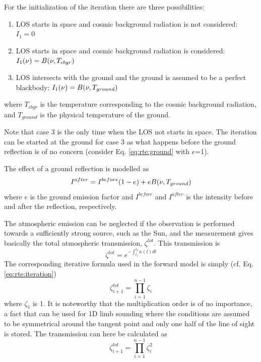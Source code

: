  
 For the initialization of the iteration there are three possibilities:
    
 \begin{enumerate}
      \item LOS starts in space and cosmic background radiation is not
            considered: $I_1=0$
      \item LOS starts in space and cosmic background radiation is 
            considered: $I_1(\nu)=B(\nu,T_{cbgr})$
      \item LOS intersects with the ground and the ground is assumed to 
            be a perfect blackbody: $I_1(\nu)=B(\nu,T_{ground})$
 \end{enumerate}
 where $T_{cbgr}$ is the temperature corresponding to the cosmic
 background radiation, and $T_{ground}$ is the physical temperature of
 the ground.
 
 Note that case 3 is the only time when the LOS not starts in space.  The
 iteration can be started at the ground for case 3 as what happens
 before the ground reflection is of no concern (consider Eq.
 \ref{eq:rte:ground} with $e$=1).


  \label{sec:rte:ground}

 The effect of a ground reflection is modelled as
 \begin{equation}
   I^{after} = I^{before}(1-e) + eB(\nu,T_{ground})
  \label{eq:rte:ground}
 \end{equation} 
 where $e$ is the ground emission factor and $I^{before}$ and
 $I^{after}$ is the intensity before and after the reflection,
 respectively. 


 \label{sec:rte:trans}
  
 The atmospheric emission can be neglected if the observation is
 performed towards a sufficiently strong source, such as the Sun, and
 the measurement gives basically the total atmospheric transmission,
 $\zeta^{tot}$. This transmission is
 \begin{equation}
   \zeta^{tot} = e^{-\int_{l_1}^{l_2}{\kappa(l)dl}}
  \label{eq:rte:tottrans}
 \end{equation}
 The corresponding iterative formula used in the forward model is
 simply (cf. Eq. \ref{eq:rte:iteration})
 \begin{equation}
   \zeta_{i+1}^{tot} = \prod_{i=1}^{n-1}\zeta_{i}
 \end{equation} 
 where $\zeta_1$ is 1. It is noteworthy that the multiplication order
 is of no importance, a fact that can be used for 1D limb sounding where
 the conditions are assumed to be symmetrical around the tangent point and
 only one half of the line of sight is stored. The transmission can here be 
 calculated as
 \begin{equation}
   \zeta_{i+1}^{tot} = \prod_{i=1}^{n-1}\zeta_{i}^2
 \end{equation} 

